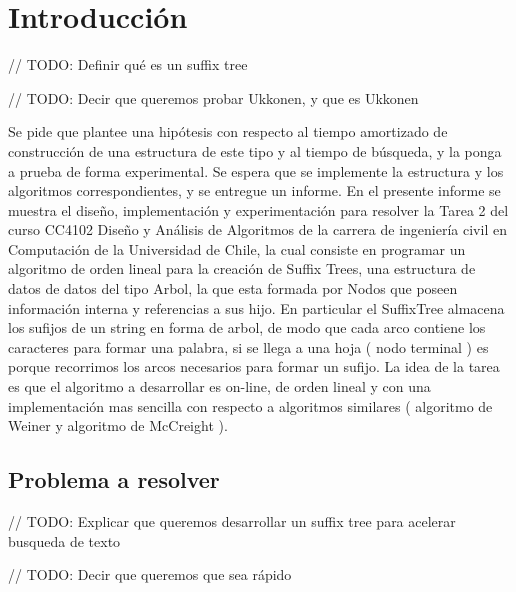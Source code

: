 \documentclass[letterpaper,10pt]{article}
\begin{document}
	\tableofcontents

	\newpage

	\section{Introducción}

	// TODO: Definir qué es un suffix tree

	// TODO: Decir que queremos probar Ukkonen, y que es Ukkonen

	Se pide que plantee una hipótesis con respecto al tiempo amortizado de construcción de una estructura de este
	tipo y al tiempo de búsqueda, y la ponga a prueba de forma experimental.
	Se espera que se implemente la estructura y los algoritmos correspondientes, y se entregue un informe.
	En el presente informe se muestra el diseño, implementación y experimentación para resolver la Tarea 2 del curso CC4102 Diseño y Análisis de Algoritmos de la carrera de ingeniería
	civil en Computación de la Universidad de Chile, la cual consiste en programar un algoritmo de orden lineal para la creación de Suffix Trees, una estructura de datos de datos del tipo Arbol,
	la que esta formada por Nodos que poseen información interna y referencias a sus hijo. En particular el SuffixTree almacena los sufijos de un string en forma de arbol, de modo que cada arco
	contiene los caracteres para formar una palabra, si se llega a una hoja ( nodo terminal ) es porque recorrimos los arcos necesarios para formar un sufijo. La idea de la tarea es que el
	algoritmo a desarrollar es on-line, de orden lineal y con una implementación mas sencilla con respecto a algoritmos similares ( algoritmo de Weiner y algoritmo de McCreight ).

	\subsection{Problema a resolver}
	// TODO: Explicar que queremos desarrollar un suffix tree para acelerar busqueda de texto

	// TODO: Decir que queremos que sea rápido
\end{document}

